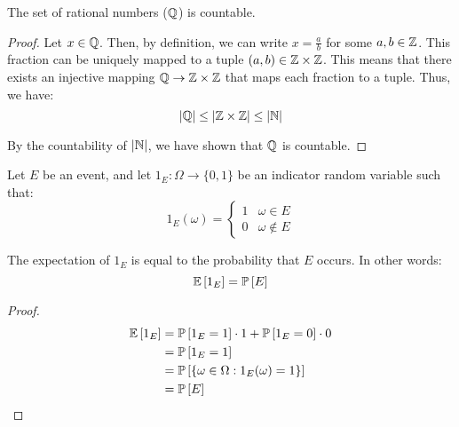 \documentclass[name=Jacob\ Strieb, andrewid=jstrieb, course=69-420, num=8]{homework}
\begin{document}
    

\begin{claim}
    The set of rational numbers ($\mathbb{Q}$) is countable.
\end{claim}
\begin{proof}
    Let $x \in \mathbb{Q}$. Then, by definition, we can write $x = \frac{a}{b}$ for some $a, b \in \mathbb{Z}$. This fraction can be uniquely mapped to a tuple $(a, b) \in \mathbb{Z} \times \mathbb{Z}$. This means that there exists an injective mapping $\mathbb{Q} \to \mathbb{Z} \times \mathbb{Z}$ that maps each fraction to a tuple. Thus, we have:
    $$ |\mathbb{Q}| \leq |\mathbb{Z} \times \mathbb{Z}| \leq |\mathbb{N}| $$
    
    By the countability of $|\mathbb{N}|$, we have shown that $\mathbb{Q}$ is countable.
\end{proof}
\newpage

Let $E$ be an event, and let $1_E : \Omega \to \{ 0, 1 \}$ be an indicator random variable such that:
$$ 1_E(\omega) = \begin{cases}
1 & \omega \in E \\
0 & \omega \notin E
\end{cases} $$

\begin{claim}
    The expectation of $1_E$ is equal to the probability that $E$ occurs. In other words:
    $$ \mathbb{E}\left[ 1_E \right] = \mathbb{P}\left[ E \right] $$
\end{claim}
\begin{proof}
    \begin{align*}
    \mathbb{E}\left[ 1_E \right] &= \mathbb{P}\left[ 1_E = 1 \right] \cdot 1 + \mathbb{P}\left[ 1_E = 0 \right] \cdot 0 \\
    &= \mathbb{P}\left[ 1_E = 1 \right] \\
    &= \mathbb{P}\left[  \{ \omega \in \Omega : 1_E(\omega) = 1 \}  \right] \\
    &= \mathbb{P}\left[ E \right]
    \end{align*}
\end{proof}
\newpage

\end{document}
